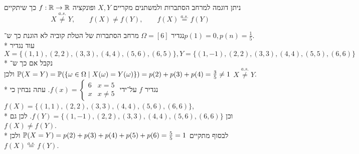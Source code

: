 \Question{}
ניתן דוגמה למרחב הסתברות ולמשתנים מקריים $X, Y$ ופונקציה $f : \mathbb{R} \to \mathbb{R}$ כך שיתקיים
\[
	X \overset{a.s.}{\ne} Y,
	\qquad
	f(X) \ne f(Y),
	\qquad
	f(X) \overset{a.s.}{=} f(Y)
\]
\begin{solution}
	נגדיר $\Omega = [6]$ מרחב הסתברות של הטלת קוביה לא הוגנת כך ש־$p(1) = 0, p(n) = \frac{1}{5}$. \\*
	עוד נגדיר $X = \{ (1, 1), (2, 2), (3, 3), (4, 4), (5, 6), (6, 5) \}, Y = \{ (1, -1), (2, 2), (3, 3), (4, 4), (5, 5), (6, 6) \}$ \\*
	נקבל אם כך ש־$\mathbb{P}(X = Y) = \mathbb{P}(\{ \omega \in \Omega \mid X(\omega) = Y(\omega) \}) = p(2) + p(3) + p(4) = \frac{3}{5} \ne 1$ ולכן $X \overset{a.s.}{\ne} Y$. \\*
	נגדיר $f$ על־ידי $f(x) = \begin{cases}
		6 & x = 5 \\
		x & x \ne 5
	\end{cases}$.
	עתה נבחין כי $f(X) = \{ (1, 1), (2, 2), (3, 3), (4, 4), (5, 6), (6, 6) \}$, \\*
	וכן $f(Y) = \{ (1, -1), (2, 2), (3, 3), (4, 4), (5, 6), (6, 6) \}$.
	לכן גם $f(X) \ne f(Y)$. \\*
	לבסוף מתקיים $\mathbb{P}(X = Y) = p(2) + p(3) + p(4) + p(5) + p(6) = \frac{5}{5} = 1$ ולכן $f(X) \overset{a.s.}{=} f(Y)$.
\end{solution}


